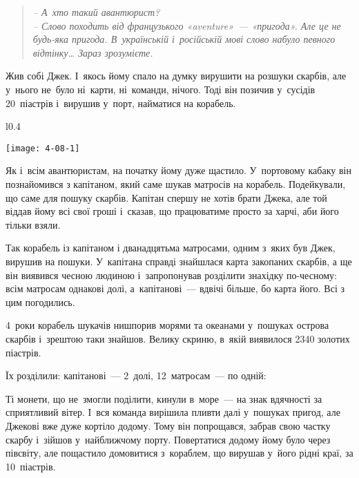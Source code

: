 \problem
{}


\begin{quote}
\itshape
    -- А~хто такий авантюрист? \\
    -- Слово походить від французького «aventure»~--- «пригода».
    Але це не будь-яка пригода.
    В~українській і~російській мові слово набуло певного відтінку\ldots
    Зараз зрозумієте.
\end{quote}

Жив собі Джек. І~якось йому спало на думку вирушити на розшуки скарбів,
але у~нього не~було ні~карти, ні~команди, нічого. Тоді він позичив
у~сусідів 20~піастрів і~вирушив у~порт, найматися на корабель.

\begin{wrapfigure}{l}{0.4\textwidth}
    \begin{center}
        \texttt{[image: 4-08-1]}
    \end{center}
\end{wrapfigure}

Як і~всім авантюристам, на початку йому дуже щастило.
У~портовому кабаку він познайомився з капітаном, який саме шукав
матросів на корабель. Подейкували, що саме для пошуку скарбів.
Капітан спершу не хотів брати Джека, але той віддав йому всі свої
гроші і~сказав, що працюватиме просто за харчі, аби його тільки взяли.

Так корабель із капітаном і дванадцятьма матросами, одним з~яких був Джек,
вирушив на пошуки. У~капітана справді знайшлася карта закопаних скарбів,
а ще він виявився чесною людиною і~запропонував розділити знахідку по-чесному:
всім матросам однакові долі, а~капітанові~--- вдвічі більше, бо карта його.
Всі з цим погодились.

4~роки корабель шукачів нишпорив морями та океанами у~пошуках острова
скарбів і~зрештою таки знайшов. Велику скриню, в~якій виявилося
2340 золотих піастрів.

Їх розділили: капітанові~--- 2~долі, 12~матросам~--- по одній:

Ті монети, що не~змогли поділити, кинули в~море~--- на знак вдячності
за сприятливий вітер. І~вся команда вирішила пливти далі у~пошуках пригод,
але Джекові вже дуже кортіло додому. Тому він попрощався, забрав свою
частку скарбу і~зійшов у~найближчому порту. Повертатися додому йому було
через півсвіту, але пощастило домовитися з~кораблем, що вирушав у~його
рідні краї, за 10~піастрів.


